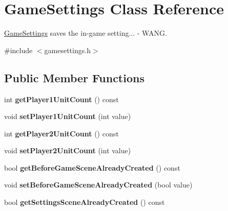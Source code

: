 \hypertarget{class_game_settings}{}\section{Game\+Settings Class Reference}
\label{class_game_settings}


\hyperlink{class_game_settings}{Game\+Settings} saves the in-\/game setting... -\/ W\+A\+NG.  




{\ttfamily \#include $<$gamesettings.\+h$>$}

\subsection*{Public Member Functions}
\begin{DoxyCompactItemize}
\item 
int {\bfseries get\+Player1\+Unit\+Count} () const \hypertarget{class_game_settings_ad6d3c2b54c8d1a4650ceaac7a6e69f3f}{}\label{class_game_settings_ad6d3c2b54c8d1a4650ceaac7a6e69f3f}

\item 
void {\bfseries set\+Player1\+Unit\+Count} (int value)\hypertarget{class_game_settings_ac23c69c7717039153d5b919a0e8ef46d}{}\label{class_game_settings_ac23c69c7717039153d5b919a0e8ef46d}

\item 
int {\bfseries get\+Player2\+Unit\+Count} () const \hypertarget{class_game_settings_a5484487465b67efc42d206bf328335e9}{}\label{class_game_settings_a5484487465b67efc42d206bf328335e9}

\item 
void {\bfseries set\+Player2\+Unit\+Count} (int value)\hypertarget{class_game_settings_a49a9f00fa1f4afea045cb723196e2e86}{}\label{class_game_settings_a49a9f00fa1f4afea045cb723196e2e86}

\item 
bool {\bfseries get\+Before\+Game\+Scene\+Already\+Created} () const \hypertarget{class_game_settings_a5e28792046b42ef08ceb9acb575fb263}{}\label{class_game_settings_a5e28792046b42ef08ceb9acb575fb263}

\item 
void {\bfseries set\+Before\+Game\+Scene\+Already\+Created} (bool value)\hypertarget{class_game_settings_a0fc66019f1439d6409fa579509243554}{}\label{class_game_settings_a0fc66019f1439d6409fa579509243554}

\item 
bool {\bfseries get\+Settings\+Scene\+Already\+Created} () const \hypertarget{class_game_settings_aeec233b1f2316d665e669b3fbd5605d0}{}\label{class_game_settings_aeec233b1f2316d665e669b3fbd5605d0}


\end{DoxyCompactItemize}
